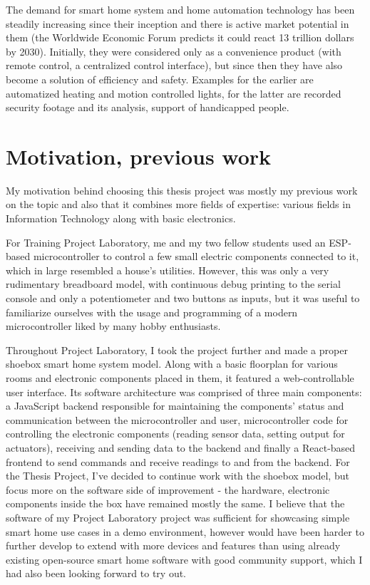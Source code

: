 The demand for smart home system and home automation technology has been steadily increasing since their inception and there is active market potential in them (the Worldwide Economic Forum predicts it could react 13 trillion dollars by 2030). Initially, they were considered only as a convenience product (with remote control, a centralized control interface), but since then they have also become a solution of efficiency and safety. Examples for the earlier are automatized heating and motion controlled lights, for the latter are recorded security footage and its analysis, support of handicapped people. \cite{ChakSHS}


\section{Motivation, previous work}

My motivation behind choosing this thesis project was mostly my previous work on the topic and also that it combines more fields of expertise: various fields in Information Technology along with basic electronics.

For Training Project Laboratory, me and my two fellow students used an ESP-based microcontroller to control a few small electric components connected to it, which in large resembled a house's utilities. However, this was only a very rudimentary breadboard model, with continuous debug printing to the serial console and only a potentiometer and two buttons as inputs, but it was useful to familiarize ourselves with the usage and programming of a modern microcontroller liked by many hobby enthusiasts.

Throughout Project Laboratory, I took the project further and made a proper shoebox smart home system model. Along with a basic floorplan for various rooms and electronic components placed in them, it featured a web-controllable user interface. Its software architecture was comprised of three main components: a JavaScript backend responsible for maintaining the components' status and communication between the microcontroller and user, microcontroller code for controlling the electronic components (reading sensor data, setting output for actuators), receiving and sending data to the backend and finally a React-based frontend to send commands and receive readings to and from the backend.
For the Thesis Project, I've decided to continue work with the shoebox model, but focus more on the software side of improvement - the hardware, electronic components inside the box have remained mostly the same. I believe that the software of my Project Laboratory project was sufficient for showcasing simple smart home use cases in a demo environment, however would have been harder to further develop to extend with more devices and features than using already existing open-source smart home software with good community support, which I had also been looking forward to try out.

